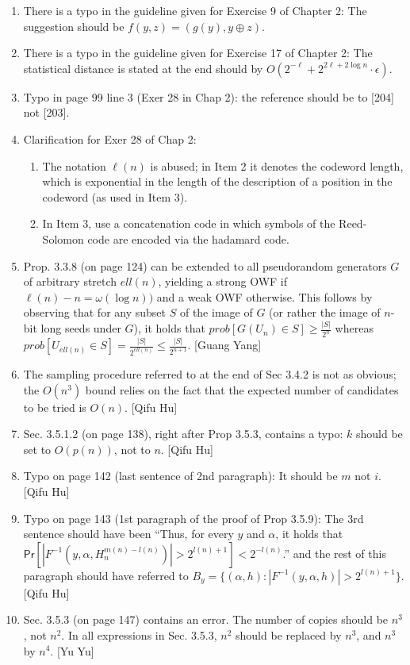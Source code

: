 \documentclass[10pt,a4paper]{article}
\newcommand{\xor}{\oplus}
\newcommand{\pr}{\mathsf{Pr}}
\begin{document}
\begin{enumerate}
	\item There is a typo in the guideline given for Exercise 9 of Chapter 2: The suggestion should be $f(y,z)=(g(y),y\xor z)$.
	\item There is a typo in the guideline given for Exercise 17 of Chapter 2: The statistical distance is stated at the end should by $O(2^{-\ell} + 2^{2\ell+2\log n}\cdot\epsilon)$.
	\item Typo in page 99 line 3 (Exer 28 in Chap 2): the reference should be to [204] not [203].
	\item Clarification for Exer 28 of Chap 2:
	\begin{enumerate}
		\item The notation $\ell(n)$ is abused; in Item 2 it denotes the codeword length, which is exponential in the length of the description of a position in the codeword (as used in Item 3).
		\item In Item 3, use a concatenation code in which symbols of the Reed-Solomon code are encoded via the hadamard code.
	\end{enumerate}
	\item Prop. 3.3.8 (on page 124) can be extended to all pseudorandom generators $G$ of arbitrary stretch $ell(n)$, yielding a strong OWF if $\ell(n)-n=\omega(\log n))$ and a weak OWF otherwise. This follows by observing that for any subset $S$ of the image of $G$ (or rather the image of $n$-bit long seeds under $G$), it holds that $prob[G(U_n)\in S] \geq \frac{|S|}{2^n}$ whereas $prob[U_{ell(n)}\in S] = \frac{|S|}{2^{ell(n)}} \leq \frac{|S|}{2^{n+1}}$. [Guang Yang]
	\item The sampling procedure referred to at the end of Sec 3.4.2 is not as obvious; the $O(n^3)$ bound relies on the fact that the expected number of candidates to be tried is $O(n)$. [Qifu Hu]
	\item Sec. 3.5.1.2 (on page 138), right after Prop 3.5.3, contains a typo: $k$ should be set to $O(p(n))$, not to $n$. [Qifu Hu]
	\item Typo on page 142 (last sentence of 2nd paragraph): It should be $m$ not $i$. [Qifu Hu]
	\item Typo on page 143 (1st paragraph of the proof of Prop 3.5.9): The 3rd sentence should have been ``Thus, for every $y$ and $\alpha$, it holds that $\pr[|F^{-1}(y,\alpha,H_{n}^{m(n)-l(n)})| >2^{l(n)+1}] < 2^{-l(n)}$.'' and the rest of this paragraph should have referred to $B_y=\{(\alpha,h):|F^{-1}(y,\alpha,h)| \!>\!2^{l(n)+1}\}$. [Qifu Hu]
	\item Sec. 3.5.3 (on page 147) contains an error. The number of copies should be $n^3$, not $n^2$. In all expressions in Sec. 3.5.3, $n^2$ should be replaced by $n^3$, and $n^3$ by $n^4$. [Yu Yu]

\end{enumerate}
\end{document}
